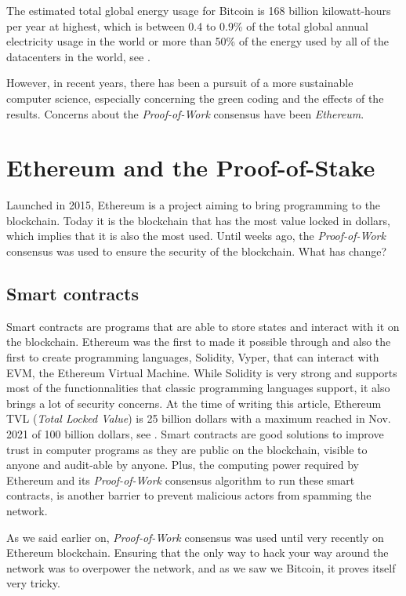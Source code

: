 \documentclass{ifacconf}
\begin{document}
 The estimated total global energy usage for Bitcoin is 168 billion kilowatt-hours per year at highest, which is between 0.4 to 0.9\% of the total global annual electricity usage in the world or more than 50\% of the energy used by all of the datacenters in the world, see \cite{TowGreen:21}.

However, in recent years, there has been a pursuit of a more sustainable computer science, especially concerning the green coding and the effects of the results. Concerns about the \textit{Proof-of-Work} consensus have been \textit{Ethereum}.

\section{Ethereum and the Proof-of-Stake}

Launched in 2015, Ethereum is a project aiming to bring programming to the blockchain. Today it is the blockchain that has the most value locked in dollars, which implies that it is also the most used. Until weeks ago, the \textit{Proof-of-Work} consensus was used to ensure the security of the blockchain. What has change?

\subsection{Smart contracts}
Smart contracts are programs that are able to store states and interact with it on the blockchain. Ethereum was the first to made it possible through and also the first to create programming languages, Solidity, Vyper, that can interact with EVM, the Ethereum Virtual Machine. While Solidity is very strong and supports most of the functionnalities that classic programming languages support, it also brings a lot of security concerns. At the time of writing this article, Ethereum TVL (\textit{Total Locked Value}) is 25 billion dollars with a maximum reached in Nov. 2021 of 100 billion dollars, see \citep[reference.][]{DefiLlama:22}. Smart contracts are good solutions to improve trust in computer programs as they are public on the blockchain, visible to anyone and audit-able by anyone. Plus, the computing power required by Ethereum and its \textit{Proof-of-Work} consensus algorithm to run these smart contracts, is another barrier to prevent malicious actors from spamming the network.

As we said earlier on, \textit{Proof-of-Work} consensus was used until very recently on Ethereum blockchain. Ensuring that the only way to hack your way around the network was to overpower the network, and as we saw we Bitcoin, it proves itself very tricky. 
\end{document}
